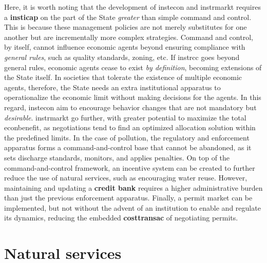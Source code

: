 \documentclass[./main_en.tex]{subfiles}
\begin{document}
\par Here, it is worth noting that the development of \gls{instecon} and \gls{instrmarkt} requires a \textbf{\gls{insticap}} on the part of the State \textit{greater} than simple command and control. This is because these management policies are not merely substitutes for one another but are incrementally more complex strategies. Command and control, by itself, cannot influence economic agents beyond ensuring compliance with \textit{general rules}, such as quality standards, zoning, etc. If \gls{instrcc} goes beyond general rules, economic agents cease to exist \textit{by definition}, becoming extensions of the State itself. In societies that tolerate the existence of multiple economic agents, therefore, the State needs an extra institutional apparatus to operationalize the economic limit without making decisions for the agents. In this regard, \gls{instecon} aim to encourage behavior changes that are not mandatory but \textit{desirable}. \gls{instrmarkt} go further, with greater potential to maximize the total \gls{econbenefit}, as negotiations tend to find an optimized allocation solution within the predefined limits. In the case of pollution, the regulatory and enforcement apparatus forms a command-and-control base that cannot be abandoned, as it sets discharge standards, monitors, and applies penalties. On top of the command-and-control framework, an incentive system can be created to further reduce the use of natural services, such as encouraging water reuse. However, maintaining and updating a \textbf{credit bank} requires a higher administrative burden than just the previous enforcement apparatus. Finally, a permit market can be implemented, but not without the advent of an institution to enable and regulate its dynamics, reducing the embedded \textbf{\gls{costtransac}} of negotiating permits.

\section{Natural services} \label{chap:ecoeco:natserv}
\end{document}
